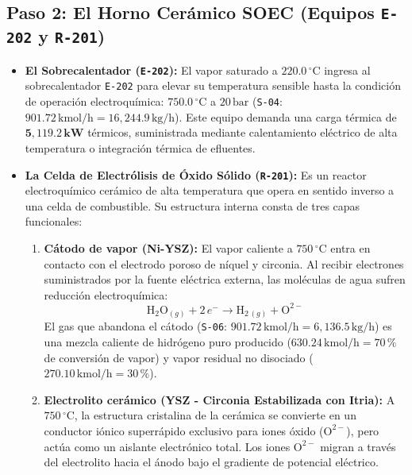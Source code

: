 \documentclass[11pt,a4paper]{article}
\begin{document}
\subsection{Paso 2: El Horno Cerámico SOEC (Equipos \texttt{E-202} y \texttt{R-201})}
\begin{itemize}
    \item \textbf{El Sobrecalentador (\texttt{E-202}):} El vapor saturado a $220.0\,^\circ\text{C}$ ingresa al sobrecalentador \texttt{E-202} para elevar su temperatura sensible hasta la condición de operación electroquímica: \textbf{$750.0\,^\circ\text{C}$} a $20\,\text{bar}$ (\texttt{S-04}: $901.72\,\text{kmol/h} = 16{,}244.9\,\text{kg/h}$). Este equipo demanda una carga térmica de $\mathbf{5{,}119.2\,\text{kW}}$ térmicos, suministrada mediante calentamiento eléctrico de alta temperatura o integración térmica de efluentes.

    \item \textbf{La Celda de Electrólisis de Óxido Sólido (\texttt{R-201}):} Es un reactor electroquímico cerámico de alta temperatura que opera en sentido inverso a una celda de combustible. Su estructura interna consta de tres capas funcionales:
    \begin{enumerate}
        \item \textbf{Cátodo de vapor (Ni-YSZ):} El vapor caliente a $750\,^\circ\text{C}$ entra en contacto con el electrodo poroso de níquel y circonia. Al recibir electrones suministrados por la fuente eléctrica externa, las moléculas de agua sufren reducción electroquímica:
        \begin{equation}
            \text{H}_2\text{O}_{(g)} + 2\,e^- \longrightarrow \text{H}_{2\,(g)} + \text{O}^{2-}
        \end{equation}
        El gas que abandona el cátodo (\texttt{S-06}: $901.72\,\text{kmol/h} = 6{,}136.5\,\text{kg/h}$) es una mezcla caliente de hidrógeno puro producido ($630.24\,\text{kmol/h} = 70\,\%$ de conversión de vapor) y vapor residual no disociado ($270.10\,\text{kmol/h} = 30\,\%$).
        
        \item \textbf{Electrolito cerámico (YSZ - Circonia Estabilizada con Itria):} A $750\,^\circ\text{C}$, la estructura cristalina de la cerámica se convierte en un conductor iónico superrápido exclusivo para iones óxido ($\text{O}^{2-}$), pero actúa como un aislante electrónico total. Los iones $\text{O}^{2-}$ migran a través del electrolito hacia el ánodo bajo el gradiente de potencial eléctrico.
        

\end{enumerate}
\end{itemize}
\end{document}
